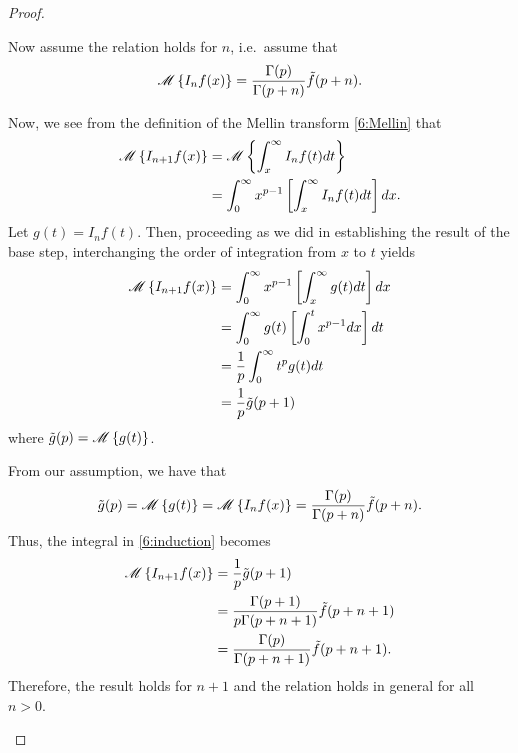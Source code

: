 \begin{proof}
\begin{enumerate}
      Now assume the relation holds for $n$, i.e.\ assume that
      \begin{align*}
        \mathscr{M}\left\{ {I_n f(x)} \right\} = \frac{\Gamma(p)}{\Gamma(p+n)} \tilde{f}(p + n).
      \end{align*}

      Now, we see from the definition of the Mellin transform \eqref{6:Mellin} that
      \begin{align*}
        \mathscr{M}\left\{ {I_{n+1} f(x)} \right\} &= \mathscr{M}\left\{ {\int_x^\infty I_n f(t) dt} \right\} \\
        &= \int_0^\infty x^{p-1} \left[\int_x^\infty I_n f(t) dt \right] dx.
      \end{align*}
      Let $g(t) = I_n f(t)$. Then, proceeding as we did in establishing the result of
      the base step, interchanging the order of integration
      from $x$ to $t$ yields
      \begin{align}
        \label{6:induction}
        \mathscr{M}\left\{ {I_{n+1} f(x)} \right\}
        &= \int_0^\infty x^{p-1} \left[\int_x^\infty g(t) dt \right] dx \notag \\
        &= \int_0^\infty g(t)  \left[\int_0^t x^{p-1}dx \right] dt \notag \\
        &= \frac{1}{p}\int_0^\infty t^p g(t)dt \notag \\
        &= \frac{1}{p}\tilde{g}(p + 1)
      \end{align}
      where $\tilde{g}(p) = \mathscr{M}\left\{ {g(t)} \right\}$.

      From our assumption, we have that
      \begin{align*}
        \tilde{g}(p) = \mathscr{M}\left\{ {g(t)} \right\} = \mathscr{M}\left\{ {I_n f(x)} \right\} = \frac{\Gamma(p)}{\Gamma(p+n)} \tilde{f}(p + n).
      \end{align*}
      Thus, the integral in \eqref{6:induction} becomes
      \begin{align*}
        \mathscr{M}\left\{ {I_{n+1} f(x)} \right\}
        &= \frac{1}{p}\tilde{g}(p + 1) \\
        &= \frac{\Gamma(p+1)}{p\Gamma(p+n+1)} \tilde{f}(p + n + 1) \\
        &= \frac{\Gamma(p)}{\Gamma(p+n+1)} \tilde{f}(p + n + 1).
      \end{align*}
      Therefore, the result holds for $n+1$ and the relation holds in general for all $n > 0$.

  \end{enumerate}
\end{proof}
\newpage
